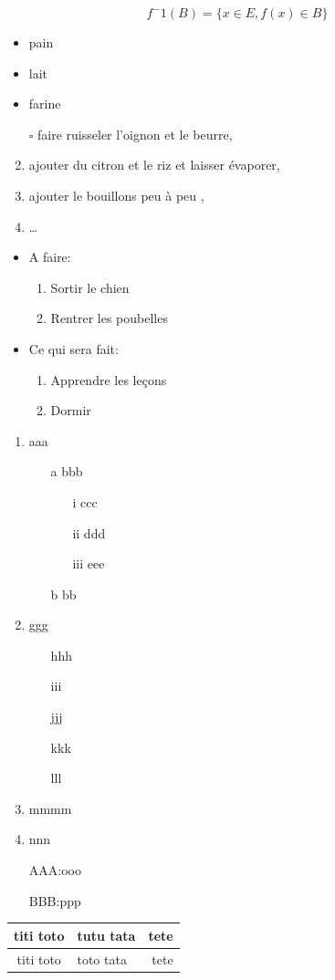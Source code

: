 \documentclass[12pt,a4paper]{article}
\begin{document}
$$ f^-1(B)=\{x \in E , f(x) \in B \} $$
\begin{itemize}
\item pain
\item lait
\item farine
\end{itemize}
\begin{enumerate}
\item [$\square $]faire ruisseler l'oignon et le beurre,
\item ajouter du citron et le riz et laisser évaporer,
\item ajouter le bouillons peu à peu ,
\item\dots
\end{enumerate}
\begin{itemize}
\item A faire:
\begin{enumerate}
\item Sortir le chien\item Rentrer les poubelles
\end{enumerate}
\item Ce qui sera fait:
\begin{enumerate}
\item Apprendre les leçons
\item Dormir
\end{enumerate}
\end{itemize}
\newpage
\begin{enumerate}
\item aaa
\begin{enumerate}
\item[a] bbb
\begin{enumerate}
\item[i]ccc
\item[ii]ddd
\item[iii] eee
\end{enumerate}
\item[b]bb
\end{enumerate}
\item ggg
\begin{enumerate}
\item[]hhh
\item [] iii
\item[] jjj
\item[] kkk
\item[] lll
\end{enumerate}
\item mmmm
\item nnn
\item[] AAA:ooo
\item[] BBB:ppp
\end{enumerate}
\begin{tabular}{|c|p{2cm}|r|}
\hline
titi toto & tutu tata  & tete\\
\hline
titi toto & toto tata  & tete\\
\hline
\end{tabular}
 
\end{document}
